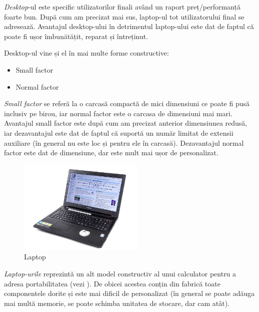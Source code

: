 
\textit{Desktop}-ul este specific utilizatorilor finali având un raport
preț/performanță foarte bun. După cum am precizat mai sus, laptop-ul tot
utilizatorului final se adresează. Avantajul desktop-ului în detrimentul
laptop-ului este dat de faptul că poate fi ușor îmbunătățit, reparat și
întreținut.

Desktop-ul vine și el în mai multe forme constructive:

\begin{itemize}
	\item Small factor
	\item Normal factor
\end{itemize}

\textit{Small factor} se referă la o carcasă compactă de mici dimensiuni ce
poate fi pusă inclusiv pe birou, iar normal factor este o carcasa de dimensiuni
mai mari. Avantajul small factor este după cum am precizat anterior
dimensiunea redusă, iar dezavantajul este dat de faptul că suportă un număr
limitat de extensii auxiliare (în general nu este loc și pentru ele în carcasă).
Dezavantajul normal factor este dat de dimensiune, dar este mult mai ușor de
personalizat.

\begin{figure}[!htbp]
	\centering
	\includegraphics[width=6cm]{chapters/08-hw/img/laptop-img.png}
	\caption{Laptop\protect\footnotemark}
	\label{fig:hw-laptop}
\end{figure}


\textit{Laptop-urile} reprezintă un alt model constructiv al unui calculator
pentru a adresa portabilitatea (vezi ). De
obicei acestea conțin din fabrică toate componentele dorite și este mai dificil
de personalizat (în general se poate adăuga mai multă memorie, se poate schimba
unitatea de stocare, dar cam atât).

